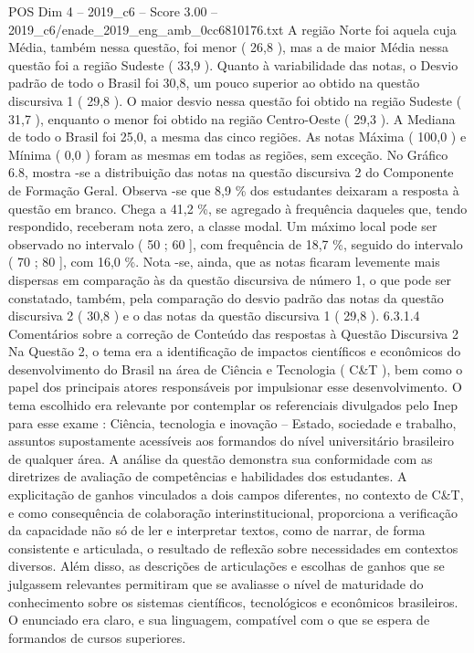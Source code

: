 \begin{textsample}{POS Dim 4 – 2019\_c6 – Score 3.00 – 2019\_c6/enade\_2019\_eng\_amb\_0cc6810176.txt}
A região Norte foi aquela cuja Média, também nessa questão, foi menor ( 26,8 ), mas a de maior Média nessa questão foi a região Sudeste ( 33,9 ).
Quanto à variabilidade das notas, o Desvio padrão de todo o Brasil foi 30,8, um pouco superior ao obtido na questão discursiva 1 ( 29,8 ).
O maior desvio nessa questão foi obtido na região Sudeste ( 31,7 ), enquanto o menor foi obtido na região Centro-Oeste ( 29,3 ).
A Mediana de todo o Brasil foi 25,0, a mesma das cinco regiões.
As notas Máxima ( 100,0 ) e Mínima ( 0,0 ) foram as mesmas em todas as regiões, sem exceção.
No Gráfico 6.8, mostra -se a distribuição das notas na questão discursiva 2 do Componente de Formação Geral.
Observa -se que 8,9 \% dos estudantes deixaram a resposta à questão em branco.
Chega a 41,2 \%, se agregado à frequência daqueles que, tendo respondido, receberam nota zero, a classe modal.
Um máximo local pode ser observado no intervalo ( 50 ; 60 ], com frequência de 18,7 \%, seguido do intervalo ( 70 ; 80 ], com 16,0 \%.
Nota -se, ainda, que as notas ficaram levemente mais dispersas em comparação às da questão discursiva de número 1, o que pode ser constatado, também, pela comparação do desvio padrão das notas da questão discursiva 2 ( 30,8 ) e o das notas da questão discursiva 1 ( 29,8 ). 6.3.1.4 Comentários sobre a correção de Conteúdo das respostas à Questão Discursiva 2 Na Questão 2, o tema era a identificação de impactos científicos e econômicos do desenvolvimento do Brasil na área de Ciência e Tecnologia ( C\&T ), bem como o papel dos principais atores responsáveis por impulsionar esse desenvolvimento.
O tema escolhido era relevante por contemplar os referenciais divulgados pelo Inep para esse exame : Ciência, tecnologia e inovação – Estado, sociedade e trabalho, assuntos supostamente acessíveis aos formandos do nível universitário brasileiro de qualquer área.
A análise da questão demonstra sua conformidade com as diretrizes de avaliação de competências e habilidades dos estudantes.
A explicitação de ganhos vinculados a dois campos diferentes, no contexto de C\&T, e como consequência de colaboração interinstitucional, proporciona a verificação da capacidade não só de ler e interpretar textos, como de narrar, de forma consistente e articulada, o resultado de reflexão sobre necessidades em contextos diversos.
Além disso, as descrições de articulações e escolhas de ganhos que se julgassem relevantes permitiram que se avaliasse o nível de maturidade do conhecimento sobre os sistemas científicos, tecnológicos e econômicos brasileiros.
O enunciado era claro, e sua linguagem, compatível com o que se espera de formandos de cursos superiores.

\end{textsample}
